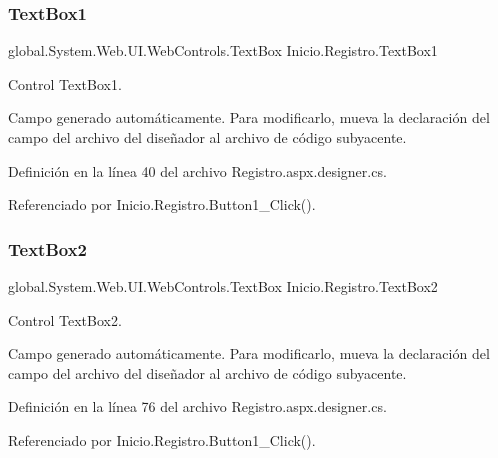 \mbox{\label{classInicio_1_1Registro_ab767617adc8dcd13a78c70824d55eb24}} 
\subsubsection{\texorpdfstring{TextBox1}{TextBox1}}
{\footnotesize\ttfamily global.\+System.\+Web.\+U\+I.\+Web\+Controls.\+Text\+Box Inicio.\+Registro.\+Text\+Box1\hspace{0.3cm}{\ttfamily [protected]}}



Control Text\+Box1. 

Campo generado automáticamente. Para modificarlo, mueva la declaración del campo del archivo del diseñador al archivo de código subyacente. 

Definición en la línea 40 del archivo Registro.\+aspx.\+designer.\+cs.



Referenciado por Inicio.\+Registro.\+Button1\+\_\+\+Click().

\mbox{\label{classInicio_1_1Registro_a24be4248d4791f6b323568f814f5e5c2}} 
\subsubsection{\texorpdfstring{TextBox2}{TextBox2}}
{\footnotesize\ttfamily global.\+System.\+Web.\+U\+I.\+Web\+Controls.\+Text\+Box Inicio.\+Registro.\+Text\+Box2\hspace{0.3cm}{\ttfamily [protected]}}



Control Text\+Box2. 

Campo generado automáticamente. Para modificarlo, mueva la declaración del campo del archivo del diseñador al archivo de código subyacente. 

Definición en la línea 76 del archivo Registro.\+aspx.\+designer.\+cs.



Referenciado por Inicio.\+Registro.\+Button1\+\_\+\+Click().

\mbox{\label{classInicio_1_1Registro_adc45c7cdfd1ee0e80f517f1bb9e827ff}} 
